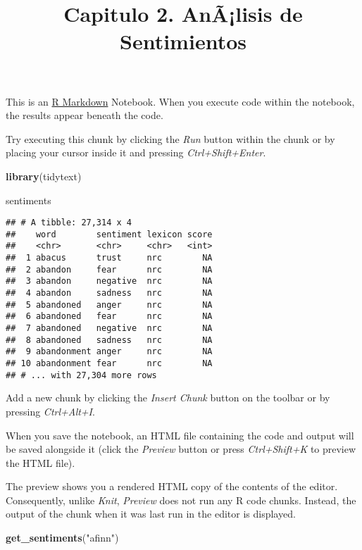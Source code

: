 \documentclass[]{article}
\title{Capitulo 2. AnÃ¡lisis de Sentimientos}
\author{}
\date{}
\newenvironment{Shaded}{\begin{snugshade}}{\end{snugshade}}
\newcommand{\KeywordTok}[1]{\textcolor[rgb]{0.13,0.29,0.53}{\textbf{#1}}}
\newcommand{\StringTok}[1]{\textcolor[rgb]{0.31,0.60,0.02}{#1}}
\newcommand{\NormalTok}[1]{#1}
\begin{document}
\maketitle

This is an \href{http://rmarkdown.rstudio.com}{R Markdown} Notebook.
When you execute code within the notebook, the results appear beneath
the code.

Try executing this chunk by clicking the \emph{Run} button within the
chunk or by placing your cursor inside it and pressing
\emph{Ctrl+Shift+Enter}.

\begin{Shaded}
\begin{Highlighting}[]
\KeywordTok{library}\NormalTok{(tidytext)}

\NormalTok{sentiments}
\end{Highlighting}
\end{Shaded}

\begin{verbatim}
## # A tibble: 27,314 x 4
##    word        sentiment lexicon score
##    <chr>       <chr>     <chr>   <int>
##  1 abacus      trust     nrc        NA
##  2 abandon     fear      nrc        NA
##  3 abandon     negative  nrc        NA
##  4 abandon     sadness   nrc        NA
##  5 abandoned   anger     nrc        NA
##  6 abandoned   fear      nrc        NA
##  7 abandoned   negative  nrc        NA
##  8 abandoned   sadness   nrc        NA
##  9 abandonment anger     nrc        NA
## 10 abandonment fear      nrc        NA
## # ... with 27,304 more rows
\end{verbatim}

Add a new chunk by clicking the \emph{Insert Chunk} button on the
toolbar or by pressing \emph{Ctrl+Alt+I}.

When you save the notebook, an HTML file containing the code and output
will be saved alongside it (click the \emph{Preview} button or press
\emph{Ctrl+Shift+K} to preview the HTML file).

The preview shows you a rendered HTML copy of the contents of the
editor. Consequently, unlike \emph{Knit}, \emph{Preview} does not run
any R code chunks. Instead, the output of the chunk when it was last run
in the editor is displayed.

\begin{Shaded}
\begin{Highlighting}[]
\KeywordTok{get_sentiments}\NormalTok{(}\StringTok{"afinn"}\NormalTok{)}
\end{Highlighting}
\end{Shaded}
\end{document}
